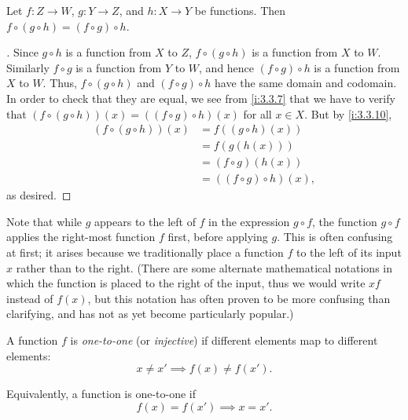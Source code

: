 \setcounter{thm}{11}
\begin{lem}\label{i:3.3.12}
  Let \(f : Z \to W\), \(g : Y \to Z\), and \(h : X \to Y\) be functions.
  Then \(f \circ (g \circ h) = (f \circ g) \circ h\).
\end{lem}

\begin{proof}[]
  Since \(g \circ h\) is a function from \(X\) to \(Z\), \(f \circ (g \circ h)\) is a function from \(X\) to \(W\).
  Similarly \(f \circ g\) is a function from \(Y\) to \(W\), and hence \((f \circ g) \circ h\) is a function from \(X\) to \(W\).
  Thus, \(f \circ (g \circ h)\) and \((f \circ g) \circ h\) have the same domain and codomain.
  In order to check that they are equal, we see from \cref{i:3.3.7} that we have to verify that \((f \circ (g \circ h))(x) = ((f \circ g) \circ h)(x)\) for all \(x \in X\).
  But by \cref{i:3.3.10},
  \begin{align*}
    (f \circ (g \circ h))(x)
     & = f((g \circ h)(x))         \\
     & = f(g(h(x)))                \\
     & = (f \circ g)(h(x))         \\
     & = ((f \circ g) \circ h)(x),
  \end{align*}
  as desired.
\end{proof}

\begin{rmk}\label{i:3.3.13}
  Note that while \(g\) appears to the left of \(f\) in the expression \(g \circ f\), the function \(g \circ f\) applies the right-most function \(f\) first, before applying \(g\).
  This is often confusing at first;
  it arises because we traditionally place a function \(f\) to the left of its input \(x\) rather than to the right.
  (There are some alternate mathematical notations in which the function is placed to the right of the input, thus we would write \(xf\) instead of \(f(x)\), but this notation has often proven to be more confusing than clarifying, and has not as yet become particularly popular.)
\end{rmk}

\begin{defn}\label{i:3.3.14}
  A function \(f\) is \emph{one-to-one} (or \emph{injective}) if different elements map to different elements:
  \[
    x \neq x' \implies f(x) \neq f(x').
  \]

  Equivalently, a function is one-to-one if
  \[
    f(x) = f(x') \implies x = x'.
  \]
\end{defn}


